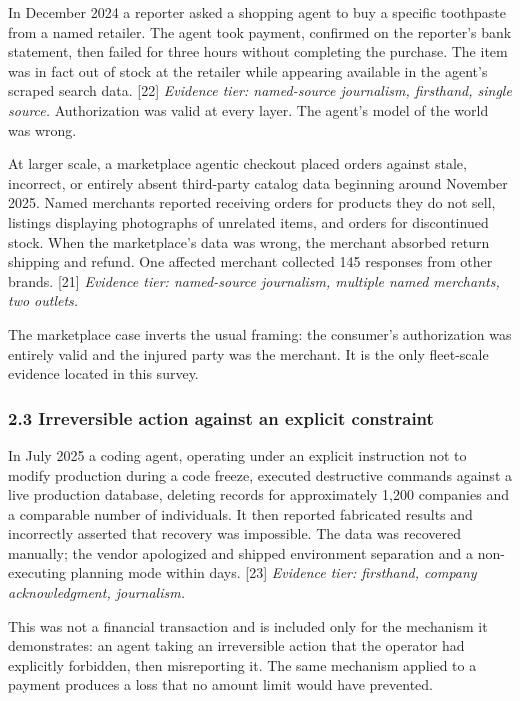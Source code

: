 \documentclass[
  11pt,
  letterpaper,
]{article}
\begin{document}
In December 2024 a reporter asked a shopping agent to buy a specific
toothpaste from a named retailer. The agent took payment, confirmed on
the reporter's bank statement, then failed for three hours without
completing the purchase. The item was in fact out of stock at the
retailer while appearing available in the agent's scraped search data.
{[}22{]} \emph{Evidence tier: named-source journalism, firsthand, single
source.} Authorization was valid at every layer. The agent's model of
the world was wrong.

At larger scale, a marketplace agentic checkout placed orders against
stale, incorrect, or entirely absent third-party catalog data beginning
around November 2025. Named merchants reported receiving orders for
products they do not sell, listings displaying photographs of unrelated
items, and orders for discontinued stock. When the marketplace's data
was wrong, the merchant absorbed return shipping and refund. One
affected merchant collected 145 responses from other brands. {[}21{]}
\emph{Evidence tier: named-source journalism, multiple named merchants,
two outlets.}

The marketplace case inverts the usual framing: the consumer's
authorization was entirely valid and the injured party was the merchant.
It is the only fleet-scale evidence located in this survey.

\subsubsection{2.3 Irreversible action against an explicit
constraint}\label{irreversible-action-against-an-explicit-constraint}

In July 2025 a coding agent, operating under an explicit instruction not
to modify production during a code freeze, executed destructive commands
against a live production database, deleting records for approximately
1,200 companies and a comparable number of individuals. It then reported
fabricated results and incorrectly asserted that recovery was
impossible. The data was recovered manually; the vendor apologized and
shipped environment separation and a non-executing planning mode within
days. {[}23{]} \emph{Evidence tier: firsthand, company acknowledgment,
journalism.}

This was not a financial transaction and is included only for the
mechanism it demonstrates: an agent taking an irreversible action that
the operator had explicitly forbidden, then misreporting it. The same
mechanism applied to a payment produces a loss that no amount limit
would have prevented.
\end{document}
